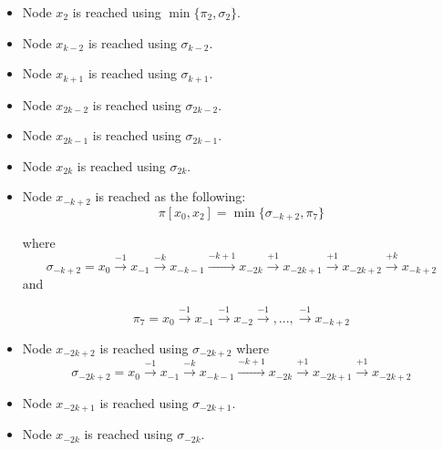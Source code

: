 \begin{itemize}
\begin{itemize}
\item Node $x_{2}$ is reached using  $\min \{   \pi_{2}, \sigma_{2}\}$. 


\item Node $x_{k-2}$ is reached using $\sigma_{k-2}$. 


\item Node $x_{k+1}$ is reached using $\sigma_{k+1}$. 

\item Node $x_{2k-2}$ is reached using $\sigma_{2k-2}$. 

\item Node $x_{2k-1}$ is reached using $\sigma_{2k-1}$. 

\item Node $x_{2k}$ is reached using $\sigma_{2k}$. 


\item Node $x_{-k+2}$ is reached as the following:
$$ \pi[x_0,x_{2}] = \min \{   \sigma_{-k+2}, \pi_{7}\}$$

   where 
$$\sigma_{-k+2} = x_{0} \xrightarrow {-1} x_{-1} \xrightarrow {-k} x_{-k-1} \xrightarrow {-k+1} x_{-2k} \xrightarrow {+1} x_{-2k+1}\xrightarrow {+1} x_{-2k+2}\xrightarrow {+k} x_{-k+2}$$ 
and 

$$\pi_{7} = x_{0} \xrightarrow {-1} x_{-1} \xrightarrow {-1} x_{-2} \xrightarrow {-1},..., \xrightarrow {-1} x_{-k+2}$$ 

\item Node $x_{-2k+2}$ is reached using $\sigma_{-2k+2}$  where 
$$\sigma_{-2k+2} = x_{0} \xrightarrow {-1} x_{-1} \xrightarrow {-k} x_{-k-1} \xrightarrow {-k+1}  x_{-2k}\xrightarrow {+1} x_{-2k+1}\xrightarrow {+1} x_{-2k+2}$$
\item Node $x_{-2k+1}$ is reached using $\sigma_{-2k+1}$.  
\item Node $x_{-2k}$ is reached using $\sigma_{-2k}$.




\end{itemize}

\end{itemize}

